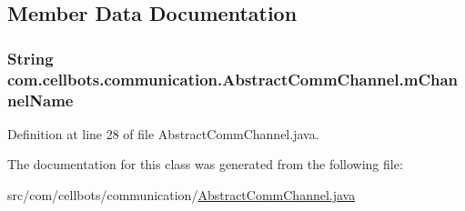 \subsection{Member Data Documentation}
\hypertarget{classcom_1_1cellbots_1_1communication_1_1_abstract_comm_channel_a1a5582c77143a40d8afde5490fc1f8b3}{
\subsubsection[{m\-Channel\-Name}]{\setlength{\rightskip}{0pt plus 5cm}String {\bf com.\-cellbots.\-communication.\-Abstract\-Comm\-Channel.\-m\-Channel\-Name}}}\label{classcom_1_1cellbots_1_1communication_1_1_abstract_comm_channel_a1a5582c77143a40d8afde5490fc1f8b3}


Definition at line 28 of file Abstract\-Comm\-Channel.\-java.



The documentation for this class was generated from the following file\-:\begin{DoxyCompactItemize}
\item 
src/com/cellbots/communication/\hyperlink{_abstract_comm_channel_8java}{Abstract\-Comm\-Channel.\-java}\end{DoxyCompactItemize}
